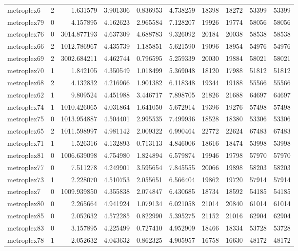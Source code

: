 \begin{longtable}{|l|r|r|r|r|r|r|r|r|r|}
metroplex6 & 2 & 1.631579 & 3.901306 & 0.836953 & 4.738259 & 18398 & 18272 & 53399 & 53399 \\
metroplex79 & 0 & 4.157895 & 4.162623 & 2.965584 & 7.128207 & 19926 & 19774 & 58056 & 58056 \\
metroplex76 & 0 & 3014.877193 & 4.637309 & 4.688783 & 9.326092 & 20184 & 20038 & 58538 & 58538 \\
metroplex66 & 2 & 1012.786967 & 4.435739 & 1.185851 & 5.621590 & 19096 & 18954 & 54976 & 54976 \\
metroplex69 & 2 & 3002.684211 & 4.462744 & 0.796595 & 5.259339 & 20030 & 19884 & 58021 & 58021 \\
metroplex70 & 1 & 1.842105 & 4.350549 & 1.018499 & 5.369048 & 18120 & 17988 & 51812 & 51812 \\
metroplex68 & 2 & 4.132832 & 4.216966 & 1.901382 & 6.118348 & 19344 & 19188 & 55566 & 55566 \\
metroplex62 & 1 & 9.809524 & 4.451988 & 3.446717 & 7.898705 & 21826 & 21688 & 64697 & 64697 \\
metroplex74 & 1 & 1010.426065 & 4.031864 & 1.641050 & 5.672914 & 19396 & 19276 & 57498 & 57498 \\
metroplex75 & 0 & 1013.954887 & 4.504401 & 2.995535 & 7.499936 & 18528 & 18380 & 53306 & 53306 \\
metroplex65 & 2 & 1011.598997 & 4.981142 & 2.009322 & 6.990464 & 22772 & 22624 & 67483 & 67483 \\
metroplex71 & 1 & 1.526316 & 4.132893 & 0.713113 & 4.846006 & 18616 & 18474 & 53998 & 53998 \\
metroplex81 & 0 & 1006.639098 & 4.754980 & 1.824894 & 6.579874 & 19946 & 19798 & 57970 & 57970 \\
metroplex77 & 0 & 7.511278 & 4.249901 & 3.595654 & 7.845555 & 20066 & 19898 & 58203 & 58203 \\
metroplex73 & 1 & 2.228070 & 4.510753 & 2.055651 & 6.566404 & 19862 & 19720 & 57914 & 57914 \\
metroplex7 & 0 & 1009.939850 & 4.355838 & 2.074847 & 6.430685 & 18734 & 18592 & 54185 & 54185 \\
metroplex80 & 0 & 2.265664 & 4.941924 & 1.079134 & 6.021058 & 21014 & 20840 & 61014 & 61014 \\
metroplex85 & 0 & 2.052632 & 4.572285 & 0.822990 & 5.395275 & 21152 & 21016 & 62904 & 62904 \\
metroplex83 & 0 & 3.157895 & 4.225499 & 0.727410 & 4.952909 & 18466 & 18334 & 53728 & 53728 \\
metroplex78 & 1 & 2.052632 & 4.043632 & 0.862325 & 4.905957 & 16758 & 16630 & 48172 & 48172 \\

\end{longtable}
